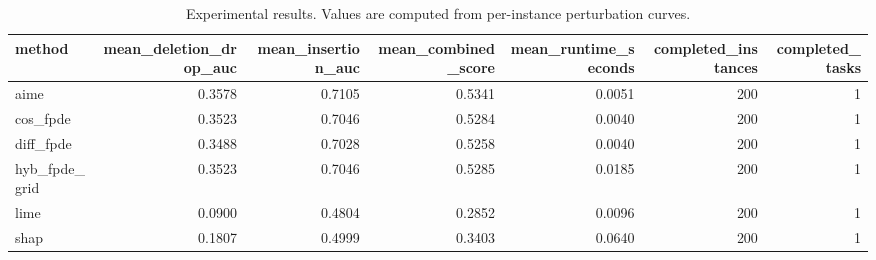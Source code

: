 \begin{table}[t]
\caption{Experimental results. Values are computed from per-instance perturbation curves.}
\label{tab:main_results_computed}
\centering
\begin{tabular}{lrrrrrr}
\toprule
method & mean\_deletion\_drop\_auc & mean\_insertion\_auc & mean\_combined\_score & mean\_runtime\_seconds & completed\_instances & completed\_tasks \\
\midrule
aime & 0.3578 & 0.7105 & 0.5341 & 0.0051 & 200 & 1 \\
cos\_fpde & 0.3523 & 0.7046 & 0.5284 & 0.0040 & 200 & 1 \\
diff\_fpde & 0.3488 & 0.7028 & 0.5258 & 0.0040 & 200 & 1 \\
hyb\_fpde\_grid & 0.3523 & 0.7046 & 0.5285 & 0.0185 & 200 & 1 \\
lime & 0.0900 & 0.4804 & 0.2852 & 0.0096 & 200 & 1 \\
shap & 0.1807 & 0.4999 & 0.3403 & 0.0640 & 200 & 1 \\
\bottomrule
\end{tabular}

\end{table}
